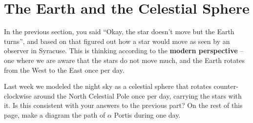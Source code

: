 \documentclass[12pt]{article}
\begin{document}
\section{The Earth and the Celestial Sphere}

In the previous section, you said ``Okay, the star doesn't move but the Earth turns'', and based on that 
figured out how a star would move as seen by an observer in Syracuse. This is thinking according to the {\bf modern perspective}
-- one where we are aware that the stars do not move much, and the Earth rotates from the West to the East once per day.

Last week we modeled the night sky as a celestial sphere that rotates counter-clockwise around the North Celestial Pole once per day, carrying
the stars with it. Is this consistent with your answers to the previous part? On the rest of this page, make a diagram the path of
$\alpha$ Portis during one day.
\end{document}
